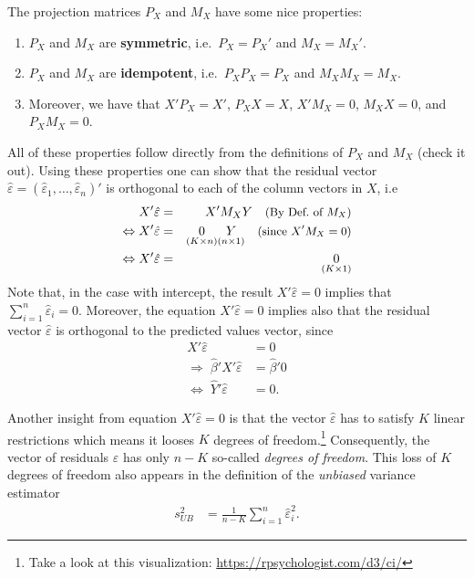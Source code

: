 \documentclass[
  letterpaper,
  DIV=11,
  numbers=noendperiod]{scrreprt}
\providecommand{\tightlist}{%
  \setlength{\itemsep}{0pt}\setlength{\parskip}{0pt}}\usepackage{longtable,booktabs,array}
\theoremstyle{definition}
\theoremstyle{plain}
\theoremstyle{plain}
\theoremstyle{remark}
\begin{document}
The projection matrices \(P_X\) and \(M_X\) have some nice properties:

\begin{enumerate}
\def\labelenumi{(\alph{enumi})}
\tightlist
\item
  \(P_X\) and \(M_X\) are \textbf{symmetric}, i.e.~\(P_X=P_X'\) and
  \(M_X=M_X'\).
\item
  \(P_X\) and \(M_X\) are \textbf{idempotent}, i.e.~\(P_XP_X=P_X\) and
  \(M_X M_X=M_X\).
\item
  Moreover, we have that \(X'P_X=X'\), \(P_XX=X\), \(X'M_X=0\),
  \(M_XX=0\), and \(P_XM_X=0\).
\end{enumerate}

All of these properties follow directly from the definitions of \(P_X\)
and \(M_X\) (check it out). Using these properties one can show that the
residual vector
\(\hat\varepsilon=(\hat\varepsilon_1,\dots,\hat\varepsilon_n)'\) is
orthogonal to each of the column vectors in \(X\), i.e \begin{eqnarray}
X'\hat\varepsilon&=&X'M_XY\quad\text{\small(By Def.~of $M_X$)}\\
\Leftrightarrow X'\hat\varepsilon&=&\underset{(K\times n)}{0}\underset{(n\times 1)}{Y}\quad\text{\small(since $X'M_X=0$)}\\
\Leftrightarrow X'\hat\varepsilon&=&\underset{(K\times 1)}{0}
\end{eqnarray} Note that, in the case with intercept, the result
\(X'\hat\varepsilon=0\) implies that
\(\sum_{i=1}^n\hat\varepsilon_i=0\). Moreover, the equation
\(X'\hat\varepsilon=0\) implies also that the residual vector
\(\hat{\varepsilon}\) is orthogonal to the predicted values vector,
since \begin{align*}
X'\hat\varepsilon&=0\\
\Rightarrow\;\hat\beta'X'\hat\varepsilon&=\hat\beta'0\\
\Leftrightarrow\;\hat Y'\hat\varepsilon&=0.
\end{align*}

Another insight from equation \(X'\hat\varepsilon=0\) is that the vector
\(\hat\varepsilon\) has to satisfy \(K\) linear restrictions which means
it looses \(K\) degrees of freedom.\footnote{Take a look at this
  visualization: \url{https://rpsychologist.com/d3/ci/}} Consequently,
the vector of residuals \(\hat\varepsilon\) has only \(n-K\) so-called
\emph{degrees of freedom}. This loss of \(K\) degrees of freedom also
appears in the definition of the \emph{unbiased} variance estimator
\begin{align}
  s_{UB}^2&=\frac{1}{n-K}\sum_{i=1}^n\hat\varepsilon_i^2\label{EqVarEstim}.
\end{align}
\end{document}

